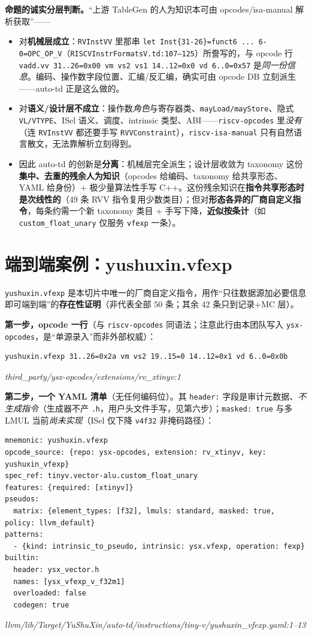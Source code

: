 \documentclass[11pt,UTF8,fontset=none]{ctexart}
\newcommand{\fcite}[1]{{\footnotesize\itshape\textcolor{framegray}{#1}}}
\begin{document}
\medskip
\noindent\textbf{命题的诚实分层判断。}“上游 TableGen 的人为知识本可由 opcodes/isa-manual 解析获取”——
\begin{itemize}[leftmargin=1.4em,itemsep=2pt]
\item 对\textbf{机械层成立}：\texttt{RVInstVV} 里那串 \texttt{let Inst\{31-26\}=funct6 ... 6-0=OPC\_OP\_V}（\texttt{RISCVInstrFormatsV.td:107--125}）所誊写的，与 opcode 行 \texttt{vadd.vv 31..26=0x00 vm vs2 vs1 14..12=0x0 vd 6..0=0x57} 是\emph{同一份信息}。编码、操作数字段位置、汇编/反汇编，确实可由 opcode DB 立刻派生——auto-td 正是这么做的。
\item 对\textbf{语义/设计层不成立}：操作数\emph{角色}与寄存器类、\texttt{mayLoad/mayStore}、隐式 \texttt{VL/VTYPE}、ISel 语义、调度、intrinsic 类型、ABI——\texttt{riscv-opcodes} 里\emph{没有}（连 \texttt{RVInstVV} 都还要手写 \texttt{RVVConstraint}），\texttt{riscv-isa-manual} 只有自然语言散文，无法靠解析立刻得到。
\item 因此 auto-td 的创新是\textbf{分离}：机械层完全派生；设计层收敛为 taxonomy 这份\textbf{集中、去重的残余人为知识}（opcodes 给编码、taxonomy 给共享形态、YAML 给身份）+ 极少量算法性手写 C++。这份残余知识在\textbf{指令共享形态时是次线性的}（49 条 RVV 指令复用少数类目）；但对\textbf{形态各异的厂商自定义指令}，每条约需一个新 taxonomy 类目 + 手写下降，\textbf{近似按条计}（如 \texttt{custom\_float\_unary} 仅服务 \texttt{vfexp} 一条）。
\end{itemize}

\section{端到端案例：yushuxin.vfexp}
\texttt{yushuxin.vfexp} 是本切片中唯一的厂商自定义指令，用作“只往数据源加必要信息即可端到端”的\textbf{存在性证明}（非代表全部 50 条；其余 42 条只到记录+MC 层）。

\textbf{第一步，opcode 一行}（与 \texttt{riscv-opcodes} 同语法；注意此行由本团队写入 \texttt{ysx-opcodes}，是“单源录入”而非外部权威）：
\begin{lstlisting}
yushuxin.vfexp 31..26=0x2a vm vs2 19..15=0 14..12=0x1 vd 6..0=0x0b
\end{lstlisting}
\fcite{third\_party/ysx-opcodes/extensions/rv\_xtinyv:1}

\textbf{第二步，一个 YAML 清单}（无任何编码位）。其 \texttt{header:} 字段是审计元数据、\emph{不生成指令}（生成器不产 \texttt{.h}，用户头文件手写，见第六步）；\texttt{masked:\ true} 与多 LMUL 当前\emph{尚未实现}（ISel 仅下降 \texttt{v4f32} 非掩码路径）：
\begin{lstlisting}
mnemonic: yushuxin.vfexp
opcode_source: {repo: ysx-opcodes, extension: rv_xtinyv, key: yushuxin_vfexp}
spec_ref: tinyv.vector-alu.custom_float_unary
features: {required: [xtinyv]}
pseudos:
  matrix: {element_types: [f32], lmuls: standard, masked: true, policy: llvm_default}
patterns:
  - {kind: intrinsic_to_pseudo, intrinsic: ysx.vfexp, operation: fexp}
builtin:
  header: ysx_vector.h
  names: [ysx_vfexp_v_f32m1]
  overloaded: false
  codegen: true
\end{lstlisting}
\fcite{llvm/lib/Target/YuShuXin/auto-td/instructions/tiny-v/yushuxin\_vfexp.yaml:1--13}
\end{document}

